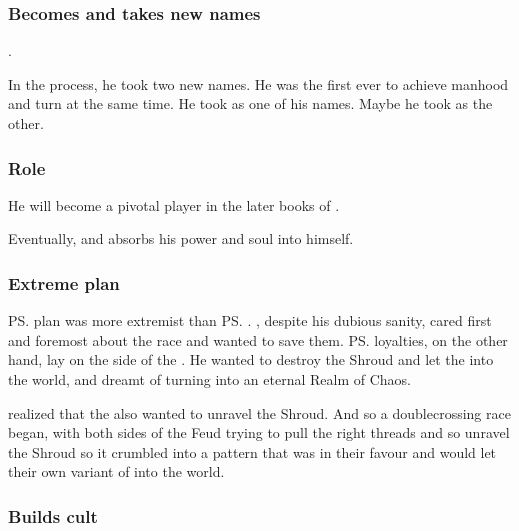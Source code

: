 \subsubsection{Becomes \shaeeroth and takes new names}
\Vizsherioch {}. 

In the process, he took two new names. 
He was the first \dragon ever to achieve manhood and turn \shaeeroth at the same time.
He took  as one of his names.
Maybe he took \quo{\Secherdamon} as the other. 





\subsubsection{Role}
He will become a pivotal player in the later books of \SentinelsofMith.

Eventually,  and \Vizsherioch{} absorbs his power and soul into himself. 





\subsubsection{Extreme plan}
\ps{\Vizsherioch} plan was more extremist than \ps{\Secherdamon}. 
\Secherdamon{}, despite his dubious sanity, cared first and foremost about the \draconian{} race and wanted to save them. 
\ps{\Vizsherioch} loyalties, on the other hand, lay on the side of the \xss. 
He wanted to destroy the Shroud and let the \xss{} into the world, and dreamt of turning \Miith{} into an eternal Realm of Chaos. 

\Vizsherioch{} realized that the \banelords{} also wanted to unravel the Shroud. 
And so a doublecrossing race began, with both sides of the Feud trying to pull the right threads and so unravel the Shroud so it crumbled into a pattern that was in their favour and would let their own variant of  into the world. 





\subsubsection{Builds cult}

